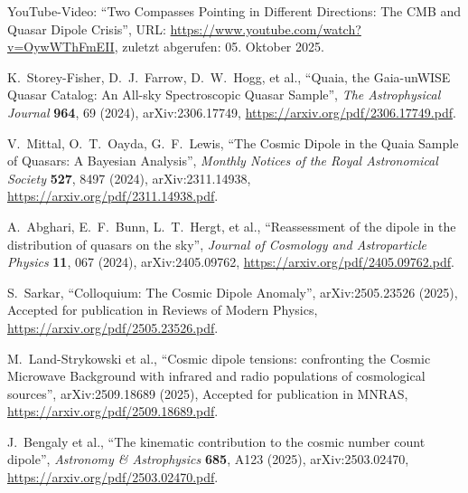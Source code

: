 \documentclass{article}
\begin{document}
	\begin{thebibliography}{9}
		
		YouTube-Video: ``Two Compasses Pointing in Different Directions: The CMB and Quasar Dipole Crisis'', 
		URL: \url{https://www.youtube.com/watch?v=OywWThFmEII}, 
		zuletzt abgerufen: 05. Oktober 2025.
		
		K.~Storey-Fisher, D.~J.~Farrow, D.~W.~Hogg, et al.,
		``Quaia, the Gaia-unWISE Quasar Catalog: An All-sky Spectroscopic Quasar Sample'',
		\emph{The Astrophysical Journal} \textbf{964}, 69 (2024),
		arXiv:2306.17749,
		\url{https://arxiv.org/pdf/2306.17749.pdf}.
		
		V.~Mittal, O.~T.~Oayda, G.~F.~Lewis,
		``The Cosmic Dipole in the Quaia Sample of Quasars: A Bayesian Analysis'',
		\emph{Monthly Notices of the Royal Astronomical Society} \textbf{527}, 8497 (2024),
		arXiv:2311.14938,
		\url{https://arxiv.org/pdf/2311.14938.pdf}.
		
		A.~Abghari, E.~F.~Bunn, L.~T.~Hergt, et al.,
		``Reassessment of the dipole in the distribution of quasars on the sky'',
		\emph{Journal of Cosmology and Astroparticle Physics} \textbf{11}, 067 (2024),
		arXiv:2405.09762,
		\url{https://arxiv.org/pdf/2405.09762.pdf}.
		
		S.~Sarkar,
		``Colloquium: The Cosmic Dipole Anomaly'',
		arXiv:2505.23526 (2025),
		Accepted for publication in Reviews of Modern Physics,
		\url{https://arxiv.org/pdf/2505.23526.pdf}.
		
		M.~Land-Strykowski et al.,
		``Cosmic dipole tensions: confronting the Cosmic Microwave Background with infrared and radio populations of cosmological sources'',
		arXiv:2509.18689 (2025),
		Accepted for publication in MNRAS,
		\url{https://arxiv.org/pdf/2509.18689.pdf}.
		
		J.~Bengaly et al.,
		``The kinematic contribution to the cosmic number count dipole'',
		\emph{Astronomy \& Astrophysics} \textbf{685}, A123 (2025),
		arXiv:2503.02470,
		\url{https://arxiv.org/pdf/2503.02470.pdf}.
		
	\end{thebibliography}
	
\end{document}
